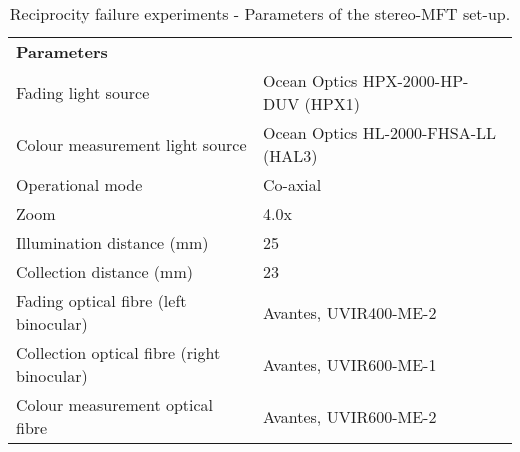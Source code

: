 \begin{table*}[!h]
\centering %
\caption[\hspace{0.3cm}Reciprocity failure experiments - Parameters of the stereo-MFT set-up.]{Reciprocity failure experiments - Parameters of the stereo-MFT set-up.}
\begin{tabular}{L{6cm}L{6.5cm}}
\toprule[0.4mm]
\textbf{Parameters} &  \\
Fading light source & Ocean Optics HPX-2000-HP-DUV (HPX1) \\
Colour measurement light source & Ocean Optics HL-2000-FHSA-LL (HAL3) \\
Operational mode & Co-axial \\
Zoom & 4.0x \\
Illumination distance (\unit{\milli\metre}) & 25 \\
Collection distance (\unit{\milli\metre}) & 23 \\
Fading optical fibre (left binocular) & Avantes, UVIR400-ME-2 \\
Collection optical fibre (right binocular) & Avantes, UVIR600-ME-1 \\
Colour measurement optical fibre & Avantes, UVIR600-ME-2 \\
\bottomrule[0.4mm]
\end{tabular}
\label{tab:rp_params-MFT}
\end{table*}

\vspace{1cm}

